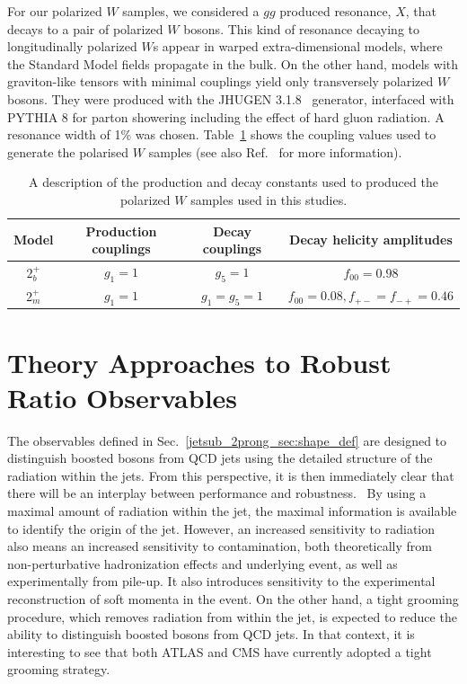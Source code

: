 \documentclass[11pt]{cernrep}
\begin{document}
For our polarized $W$ samples, we considered a $gg$ produced resonance, $X$, that decays to a pair of polarized $W$ bosons.
%
This kind of resonance decaying to longitudinally polarized $W$s appear in warped extra-dimensional models, where the Standard Model fields propagate in the bulk.
%
On the other hand, models with graviton-like tensors with minimal couplings yield only transversely polarized $W$ bosons.
%
They were produced with the \textsc{JHUGEN} 3.1.8~\cite{Gao:2010qx,Bolognesi:2012mm} generator, interfaced with \textsc{PYTHIA} 8 \cite{Sjostrand:2007gs} for parton showering including the effect of hard gluon radiation.
A resonance width of 1\% was chosen.
%
Table~\ref{jetsub_2prong_table:polarisedSamples} shows the coupling values used to generate the polarised $W$ samples (see also Ref.~\cite{Gao:2010qx} for more information). 

\begin{table}[t]
\centering
\begin{tabular}{|c|c|c|c|}
\hline
Model	&Production couplings	&Decay couplings	&Decay helicity amplitudes 	\\
\hline
$2_b^+$	& $g_1=1$		& $g_5=1$		& $f_{00}=0.98$			\\
$2_m^+$	& $g_1=1$		& $g_1=g_5=1$		& $f_{00}=0.08,f_{+-}=f_{-+}=0.46$\\	
\hline
\end{tabular}
\caption{A description of the production and decay constants used to produced the polarized $W$ samples used in this studies.}
\label{jetsub_2prong_table:polarisedSamples}
\end{table}



\section{Theory Approaches to Robust Ratio Observables}\label{jetsub_2prong_sec:hybrid_ratio}

The observables defined in Sec.~\ref{jetsub_2prong_sec:shape_def} are designed to
distinguish boosted bosons from QCD jets using the detailed structure
of the radiation within the jets.
%
From this perspective, it is then
immediately clear that there will be an interplay between performance
and robustness.\
%
By using a maximal amount of radiation within the jet,
the maximal information is available to identify the origin of the
jet.
%
However, an increased sensitivity to radiation also means an
increased sensitivity to contamination, both theoretically from
non-perturbative hadronization effects and underlying event, as well
as experimentally from pile-up.
%
It also introduces sensitivity to the
experimental reconstruction of soft momenta in the event.
% 
On the other
hand, a tight grooming procedure, which removes radiation from within
the jet, is expected to reduce the ability to distinguish boosted
bosons from QCD jets.
%
In that context, it is interesting to see that both ATLAS and CMS
have currently adopted a tight grooming strategy.
\end{document}
